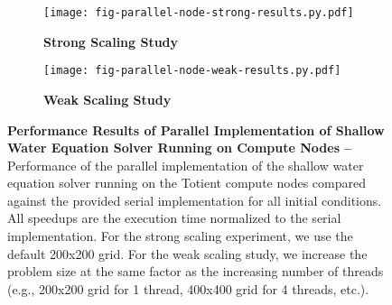 
\begin{figure}[h]

  \begin{minipage}[t]{0.48\tw}
  \begin{subfigure}{\tw}

  \centering
  \texttt{[image: fig-parallel-node-strong-results.py.pdf]}
  \caption{\textbf{Strong Scaling Study}}
  \label{fig-parallel-node-strong-results}

  \end{subfigure}
  \end{minipage}%
  \hfill%
  \begin{minipage}[t]{0.48\tw}
  \begin{subfigure}{\tw}

  \centering
  \texttt{[image: fig-parallel-node-weak-results.py.pdf]}
  \caption{\textbf{Weak Scaling Study}}
  \label{fig-parallel-node-weak-results}

  \end{subfigure}
  \end{minipage}%

  \caption{\textbf{Performance Results of Parallel Implementation of
      Shallow Water Equation Solver Running on Compute Nodes --}
    Performance of the parallel implementation of the shallow water
    equation solver running on the Totient compute nodes compared against
    the provided serial implementation for all initial conditions. All
    speedups are the execution time normalized to the serial
    implementation. For the strong scaling experiment, we use the default
    200x200 grid.  For the weak scaling study, we increase the problem
    size at the same factor as the increasing number of threads (e.g.,
    200x200 grid for 1 thread, 400x400 grid for 4 threads, etc.). }

  \label{fig-parallel-node-results}

\end{figure}
